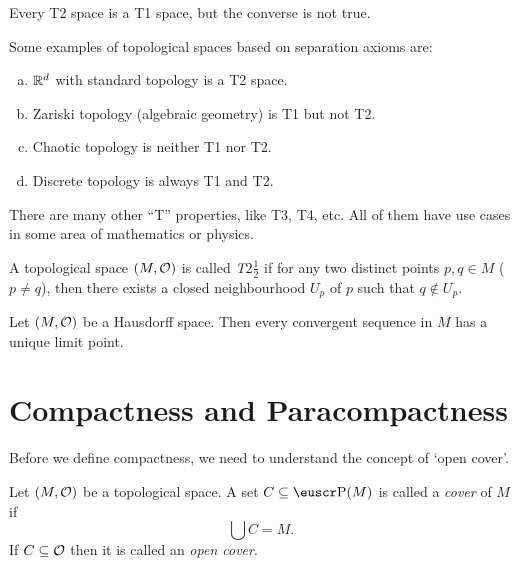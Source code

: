 \begin{remark}[T1 vs T2]
	Every T2 space is a T1 space, but the converse is not true.
\end{remark}

\begin{example}
	Some examples of topological spaces based on separation axioms are:
	\begin{enumerate}[(a)]
		\item \(\mathbb R^d\) with standard topology is a T2 space.
		\item Zariski topology (algebraic geometry) is T1 but not T2.
		\item Chaotic topology is neither T1 nor T2.
		\item Discrete topology is always T1 and T2.
	\end{enumerate}
\end{example}


There are many other ``T'' properties, like T3, T4, etc. All of them have use cases in some area of mathematics or physics.
\begin{remark}
	A topological space \((M, \mathcal{O})\) is called \emph{T$2\frac{1}{2}$} if for any two distinct points \(p, q \in M\) (\ie\ \(p \neq q\)), then there exists a closed neighbourhood \(U_p\) of \(p\) such that \(q \notin U_p\).
\end{remark}

\begin{theorem}\label{thm:uniqueness_limit_point}
	Let \((M, \mathcal{O})\) be a Hausdorff space. Then every convergent sequence in \(M\) has a unique limit point.
\end{theorem}

\section{Compactness and Paracompactness}

Before we define compactness, we need to understand the concept of `open cover'.

\begin{definition}\label{def:cover}
	Let \((M, \mathcal{O})\) be a topological space. A set \(C \subseteq \powerset(M)\) is called a \emph{cover} of \(M\) if
	\begin{equation}
		\bigcup C = M. \label{eq:cover}
	\end{equation}
	If \(C \subseteq \mathcal{O}\) then it is called an \emph{open cover}.
\end{definition}


